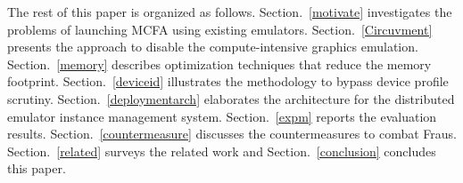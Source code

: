 \documentclass[conference]{IEEEtranl}
\begin{document}




	The rest of this paper is organized as follows. Section.~\ref{motivate} investigates the problems of launching MCFA using existing emulators.
	Section.~\ref{Circuvment} presents the approach to disable the compute-intensive graphics emulation. Section.~\ref{memory} describes optimization techniques that reduce the memory footprint. Section.~\ref{deviceid} illustrates the methodology to bypass device profile scrutiny. Section.~\ref{deploymentarch} elaborates the architecture for the distributed emulator instance management system.  Section.~\ref{expm} reports the evaluation results. Section.~\ref{countermeasure} discusses the countermeasures to combat Fraus. Section.~\ref{related} surveys the related work and Section.~\ref{conclusion} concludes this paper.
\end{document}
